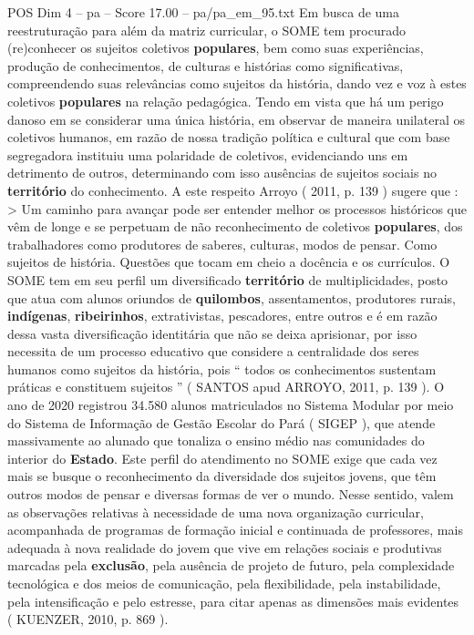 \begin{textsample}{POS Dim 4 – pa – Score 17.00 – pa/pa\_em\_95.txt}
Em busca de uma reestruturação para além da matriz curricular, o SOME tem procurado (re)conhecer os sujeitos coletivos \textbf{populares}, bem como suas experiências, produção de conhecimentos, de culturas e histórias como significativas, compreendendo suas relevâncias como sujeitos da história, dando vez e voz à estes coletivos \textbf{populares} na relação pedagógica.
Tendo em vista que há um perigo danoso em se considerar uma única história, em observar de maneira unilateral os coletivos humanos, em razão de nossa tradição política e cultural que com base segregadora instituiu uma polaridade de coletivos, evidenciando uns em detrimento de outros, determinando com isso ausências de sujeitos sociais no \textbf{território} do conhecimento.
A este respeito Arroyo ( 2011, p. 139 ) sugere que : > Um caminho para avançar pode ser entender melhor os processos históricos que vêm de longe e se perpetuam de não reconhecimento de coletivos \textbf{populares}, dos trabalhadores como produtores de saberes, culturas, modos de pensar.
Como sujeitos de história.
Questões que tocam em cheio a docência e os currículos.
O SOME tem em seu perfil um diversificado \textbf{território} de multiplicidades, posto que atua com alunos oriundos de \textbf{quilombos}, assentamentos, produtores rurais, \textbf{indígenas}, \textbf{ribeirinhos}, extrativistas, pescadores, entre outros e é em razão dessa vasta diversificação identitária que não se deixa aprisionar, por isso necessita de um processo educativo que considere a centralidade dos seres humanos como sujeitos da história, pois “ todos os conhecimentos sustentam práticas e constituem sujeitos ” ( SANTOS apud ARROYO, 2011, p. 139 ).
O ano de 2020 registrou 34.580 alunos matriculados no Sistema Modular por meio do Sistema de Informação de Gestão Escolar do Pará ( SIGEP ), que atende massivamente ao alunado que tonaliza o ensino médio nas comunidades do interior do \textbf{Estado}.
Este perfil do atendimento no SOME exige que cada vez mais se busque o reconhecimento da diversidade dos sujeitos jovens, que têm outros modos de pensar e diversas formas de ver o mundo.
Nesse sentido, valem as observações relativas à necessidade de uma nova organização curricular, acompanhada de programas de formação inicial e continuada de professores, mais adequada à nova realidade do jovem que vive em relações sociais e produtivas marcadas pela \textbf{exclusão}, pela ausência de projeto de futuro, pela complexidade tecnológica e dos meios de comunicação, pela flexibilidade, pela instabilidade, pela intensificação e pelo estresse, para citar apenas as dimensões mais evidentes ( KUENZER, 2010, p. 869 ).

\end{textsample}

